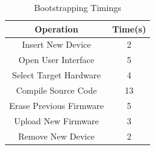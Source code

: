 \begin{table}
\centering
\caption{Bootstrapping Timings}
\label{tab:bootstrapping_time}
\begin{tabular}{|c|c|} \hline
Operation&Time(s)\\ \hline
Insert New Device&2\\ \hline
Open User Interface&5\\ \hline
Select Target Hardware&4\\ \hline
Compile Source Code&13\\ \hline
Erase Previous Firmware&5\\ \hline
Upload New Firmware&3\\ \hline
Remove New Device&2\\ 
\hline\end{tabular}
\end{table}

